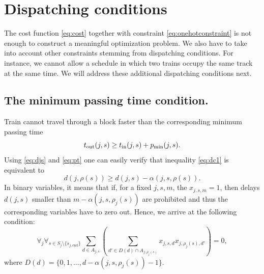 \section{Dispatching conditions}
The cost function \eqref{eq:cost} together with constraint \eqref{eq:onehotconstraint} is not enough to
construct a meaningful optimization problem. We also have to take into account other constraints stemming
from dispatching conditions. For instance, we cannot allow a schedule in which two trains occupy the
same track at the same time. We will address these additional dispatching conditions next.

\subsection{The minimum passing time condition.}
Train cannot travel through a block faster than the corresponding minimum
passing time
\begin{equation}
  \label{eq:dc1}
  t_\text{out}(j, s) \ge t_\text{in}(j, s) + p_\text{min}(j, s).
\end{equation}
Using \eqref{eq:djs} and \eqref{eq:pt} one can easily verify that
inequality \eqref{eq:dc1} is equivalent to
\begin{equation}
  \label{eq:passingtime}
  d(j, \rho(s)) \ge d(j, s) - \alpha(j, s, \rho(s)).
\end{equation}
In binary variables, it means that if, for a fixed $j,s,m$, the $x_{j,s,m}=1$, then delays
$d(j,s)$ smaller than $m-\alpha(j, s, \rho_j(s))$ are prohibited and thus the corresponding
  variables have to zero out. Hence, we arrive at the following condition:
\begin{equation}
  \label{eq:qubo:passingtime}
  \forall_{j} \forall_{s \in S_j \setminus \{s_{{j,\text{end}}}\}}
  \sum_{d \in A_{j,s}}
  \left(
  \sum_{ d' \in D(d) \cap A_{j, \rho_j(s)}} x_{j, s, d}
  x_{j, \rho_j(s), d'} \right) = 0,
\end{equation}
where $D(d) = \{0, 1, \ldots, d - \alpha(j, s, \rho_j(s)) -1\}$.
